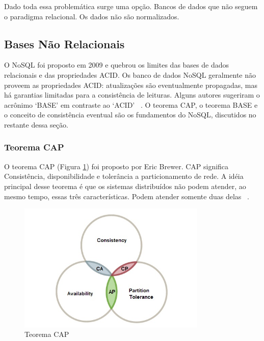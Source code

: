 Dado toda essa problemática surge uma opção. Bancos de dados que não seguem o paradigma relacional. Os dados não são normalizados.

\subsection{Bases Não Relacionais}

O NoSQL foi proposto em 2009 e quebrou os limites das bases de dados relacionais e das propriedades ACID. Os banco de dados NoSQL geralmente não proveem as propriedades ACID: atualizações são eventualmente propagadas, mas há garantias limitadas para a consistência de leituras. Alguns autores sugeriram  o acrônimo ‘BASE’ em contraste ao ‘ACID’ ~\cite{scalablesqlandnosql}. O teorema CAP, o teorema BASE e o conceito de consistência eventual são os fundamentos do NoSQL, discutidos no restante dessa seção.

\subsubsection{Teorema CAP}

O teorema CAP (Figura \ref{fig:captheorem}) foi proposto por Eric Brewer. CAP significa Consistência,  disponibilidade e tolerância a particionamento de rede.  A idéia principal desse teorema é que os sistemas distribuídos não podem atender, ao mesmo tempo, essas três características. Podem atender somente duas delas ~\cite{nosqlaplicassandra}.

	\begin{figure}[!htbp]
		\begin{center}
			\includegraphics[width=0.8\textwidth]{captheorem}
		\end{center}
		\caption{Teorema CAP ~\cite{capimage} }
		\label{fig:captheorem}
	\end{figure}

